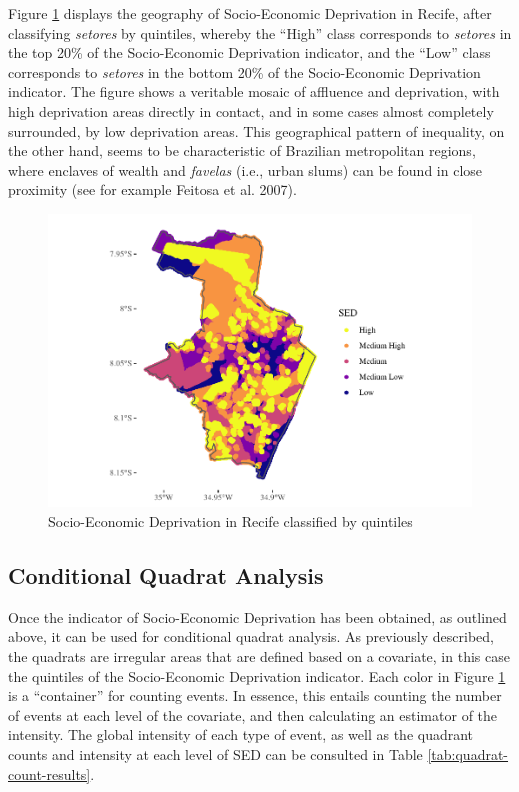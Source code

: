 \documentclass[smallextended]{svjour3}       %
\begin{document}
Figure \ref{fig:plot-sed-as-quintiles} displays the geography of
Socio-Economic Deprivation in Recife, after classifying \emph{setores}
by quintiles, whereby the ``High'' class corresponds to \emph{setores}
in the top 20\% of the Socio-Economic Deprivation indicator, and the
``Low'' class corresponds to \emph{setores} in the bottom 20\% of the
Socio-Economic Deprivation indicator. The figure shows a veritable
mosaic of affluence and deprivation, with high deprivation areas
directly in contact, and in some cases almost completely surrounded, by
low deprivation areas. This geographical pattern of inequality, on the
other hand, seems to be characteristic of Brazilian metropolitan
regions, where enclaves of wealth and \emph{favelas} (i.e., urban slums)
can be found in close proximity (see for example Feitosa et al. 2007).

\begin{figure}
\centering
\includegraphics{Moral_Communities_and_Crime_files/figure-latex/plot-sed-as-quintiles-1.pdf}
\caption{\label{fig:plot-sed-as-quintiles}Socio-Economic Deprivation in
Recife classified by quintiles}
\end{figure}

\hypertarget{conditional-quadrat-analysis}{%
\subsection{Conditional Quadrat
Analysis}\label{conditional-quadrat-analysis}}

Once the indicator of Socio-Economic Deprivation has been obtained, as
outlined above, it can be used for conditional quadrat analysis. As
previously described, the quadrats are irregular areas that are defined
based on a covariate, in this case the quintiles of the Socio-Economic
Deprivation indicator. Each color in Figure
\ref{fig:plot-sed-as-quintiles} is a ``container'' for counting events.
In essence, this entails counting the number of events at each level of
the covariate, and then calculating an estimator of the intensity. The
global intensity of each type of event, as well as the quadrant counts
and intensity at each level of SED can be consulted in Table
\ref{tab:quadrat-count-results}.
\end{document}
